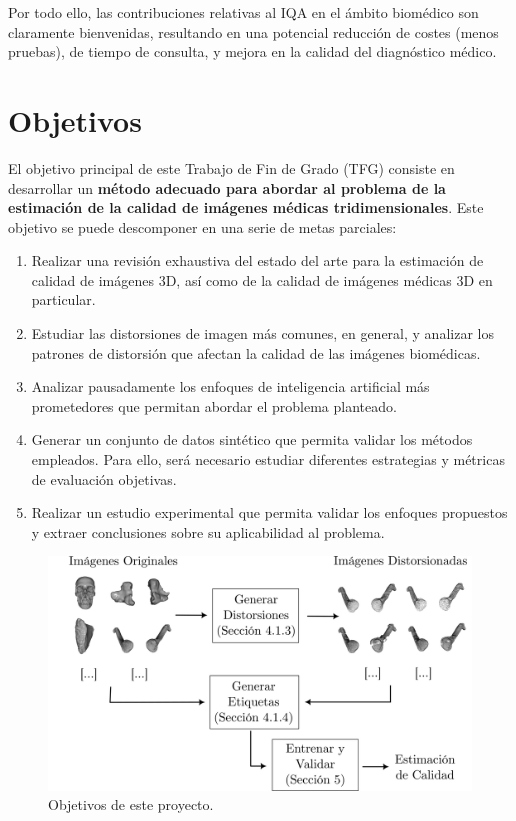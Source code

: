 Por todo ello, las contribuciones relativas al IQA en el 
ámbito biomédico son claramente bienvenidas, resultando en 
una potencial reducción de costes (menos pruebas), de tiempo de consulta, y mejora 
en la calidad del diagnóstico médico. 

\section{Objetivos}
El objetivo principal de este Trabajo de Fin de Grado (TFG) 
consiste en desarrollar un \textbf{método adecuado para abordar al 
problema de la estimación de la calidad de imágenes médicas tridimensionales}. 
Este objetivo se puede descomponer en una serie de metas parciales: 
\begin{enumerate}
  \item Realizar una revisión exhaustiva del estado del arte para la estimación de calidad 
    de imágenes 3D, así como de la calidad de imágenes médicas 3D en particular.
  \item Estudiar las distorsiones de imagen más comunes, en general, y analizar los patrones de distorsión que afectan la calidad de las imágenes 
    biomédicas.
  \item Analizar pausadamente los enfoques de inteligencia artificial más prometedores que permitan abordar el problema planteado. 
  \item Generar un conjunto de datos sintético que permita validar 
    los métodos empleados. Para ello, será necesario estudiar diferentes 
    estrategias y métricas de evaluación objetivas.
  \item Realizar un estudio experimental que permita validar los enfoques 
    propuestos y extraer conclusiones sobre su aplicabilidad al problema. 
\end{enumerate}

\begin{figure}
  \begin{center}
    \includegraphics[width=\textwidth]{imagenes/chapter1/Objetivos}
  \end{center}
  \caption{Objetivos de este proyecto.}
  \label{fig:Objetivos}
\end{figure}


